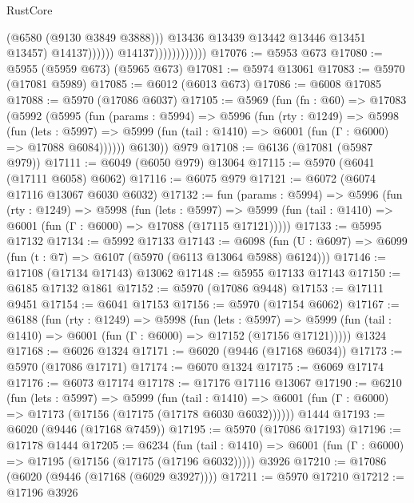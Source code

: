 \begin{lexlean}{RustCore}
\begin{coremodule}
                                            (@6580 (@9130 @3849 @3888)))
                                          @13436
                                          @13439
                                          @13442
                                          @13446
                                          @13451
                                          @13457)
                                        @14137))))))
                            @14137))))))))))))
@17076 := @5953 @673
@17080 := @5955 (@5959 @673) (@5965 @673)
@17081 := @5974 @13061
@17083 := @5970 (@17081 @5989)
@17085 := @6012 (@6013 @673)
@17086 := @6008 @17085
@17088 := @5970 (@17086 @6037)
@17105 := @5969
    (fun (fn : @60) =>
    @17083
      (@5992
        (@5995
          (fun (params : @5994) =>
          @5996
            (fun (rty : @1249) =>
            @5998
              (fun (lets : @5997) =>
              @5999 (fun (tail : @1410) => @6001 (fun (Γ : @6000) => @17088 @6084))))))
        @6130))
    @979
@17108 := @6136 (@17081 (@5987 @979))
@17111 := @6049 (@6050 @979) @13064
@17115 := @5970 (@6041 (@17111 @6058) @6062)
@17116 := @6075 @979
@17121 := @6072 (@6074 @17116 @13067 @6030 @6032)
@17132 := fun (params : @5994) =>
  @5996
    (fun (rty : @1249) =>
    @5998
      (fun (lets : @5997) =>
      @5999 (fun (tail : @1410) => @6001 (fun (Γ : @6000) => @17088 (@17115 @17121)))))
@17133 := @5995 @17132
@17134 := @5992 @17133
@17143 := @6098
    (fun (U : @6097) => @6099 (fun (t : @7) => @6107 (@5970 (@6113 @13064 @5988) @6124)))
@17146 := @17108 (@17134 @17143) @13062
@17148 := @5955 @17133 @17143
@17150 := @6185 @17132 @1861
@17152 := @5970 (@17086 @9448)
@17153 := @17111 @9451
@17154 := @6041 @17153
@17156 := @5970 (@17154 @6062)
@17167 := @6188
    (fun (rty : @1249) =>
    @5998
      (fun (lets : @5997) =>
      @5999 (fun (tail : @1410) => @6001 (fun (Γ : @6000) => @17152 (@17156 @17121)))))
    @1324
@17168 := @6026 @1324
@17171 := @6020 (@9446 (@17168 @6034))
@17173 := @5970 (@17086 @17171)
@17174 := @6070 @1324
@17175 := @6069 @17174
@17176 := @6073 @17174
@17178 := @17176 @17116 @13067
@17190 := @6210
    (fun (lets : @5997) =>
    @5999
      (fun (tail : @1410) =>
      @6001 (fun (Γ : @6000) => @17173 (@17156 (@17175 (@17178 @6030 @6032))))))
    @1444
@17193 := @6020 (@9446 (@17168 @7459))
@17195 := @5970 (@17086 @17193)
@17196 := @17178 @1444
@17205 := @6234
    (fun (tail : @1410) => @6001 (fun (Γ : @6000) => @17195 (@17156 (@17175 (@17196 @6032)))))
    @3926
@17210 := @17086 (@6020 (@9446 (@17168 (@6029 @3927))))
@17211 := @5970 @17210
@17212 := @17196 @3926

\end{coremodule}
\end{lexlean}
